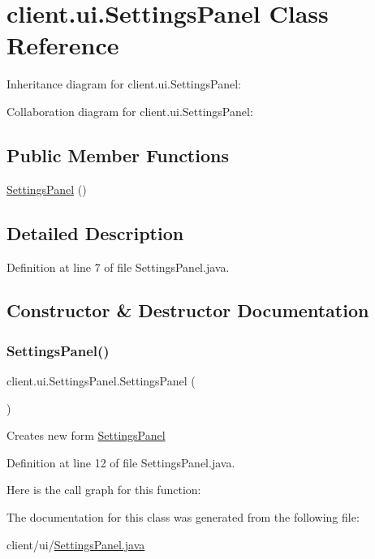 \hypertarget{classclient_1_1ui_1_1_settings_panel}{}\section{client.\+ui.\+Settings\+Panel Class Reference}
\label{classclient_1_1ui_1_1_settings_panel}


Inheritance diagram for client.\+ui.\+Settings\+Panel\+:


Collaboration diagram for client.\+ui.\+Settings\+Panel\+:
\subsection*{Public Member Functions}
\begin{DoxyCompactItemize}
\item 
\hyperlink{classclient_1_1ui_1_1_settings_panel_a95dfa76100b4d18863cd0b572c631ebf}{Settings\+Panel} ()
\end{DoxyCompactItemize}


\subsection{Detailed Description}


Definition at line 7 of file Settings\+Panel.\+java.



\subsection{Constructor \& Destructor Documentation}
\hypertarget{classclient_1_1ui_1_1_settings_panel_a95dfa76100b4d18863cd0b572c631ebf}{}\label{classclient_1_1ui_1_1_settings_panel_a95dfa76100b4d18863cd0b572c631ebf} 
\subsubsection{\texorpdfstring{Settings\+Panel()}{SettingsPanel()}}
{\footnotesize\ttfamily client.\+ui.\+Settings\+Panel.\+Settings\+Panel (\begin{DoxyParamCaption}{ }\end{DoxyParamCaption})}

Creates new form \hyperlink{classclient_1_1ui_1_1_settings_panel}{Settings\+Panel} 

Definition at line 12 of file Settings\+Panel.\+java.

Here is the call graph for this function\+:


The documentation for this class was generated from the following file\+:\begin{DoxyCompactItemize}
\item 
client/ui/\hyperlink{_settings_panel_8java}{Settings\+Panel.\+java}\end{DoxyCompactItemize}
